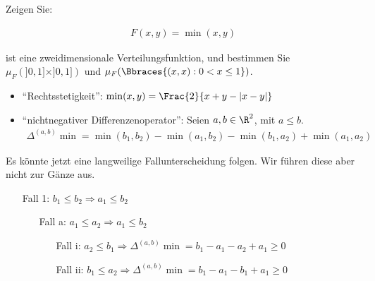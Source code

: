 
\begin{exercise}

Zeigen Sie:

\begin{align*}
  F(x, y) = \min(x, y)
\end{align*}

ist eine zweidimensionale Verteilungsfunktion, und bestimmen Sie $\mu_F(]0, 1] \times ]0, 1])$ und $\mu_F(\Bbraces{(x, x) : 0 < x \leq 1})$.

\end{exercise}


\begin{solution}

\phantom{}

\begin{itemize}

  \item \enquote{Rechtsstetigkeit}: $\min(x, y) = \Frac{2}{x + y - |x - y|}$

  \item \enquote{nichtnegativer Differenzenoperator}: Seien $a, b \in \R^2$, mit $a \leq b$.
  \begin{align*}
    \Delta^{(a, b)} \min
    =
    \min(b_1, b_2) - \min(a_1, b_2) - \min(b_1, a_2) + \min(a_1, a_2)
  \end{align*}

\end{itemize}

Es könnte jetzt eine langweilige Fallunterscheidung folgen. Wir führen diese aber nicht zur Gänze aus.

\begin{itemize}
  \item[Fall 1:] $b_1 \leq b_2 \Rightarrow a_1 \leq b_2$
  \begin{itemize}
    \item[Fall a:] $a_1 \leq a_2 \Rightarrow a_1 \leq b_2$
    \begin{itemize}
      \item[Fall i:] $a_2 \leq b_1 \Rightarrow
      \Delta^{(a, b)} \min = b_1 - a_1 - a_2 + a_1 \geq 0$
      \item[Fall ii:] $b_1 \leq a_2 \Rightarrow
      \Delta^{(a, b)} \min = b_1 - a_1 - b_1 + a_1 \geq 0$
    \end{itemize}
  \end{itemize}
\end{itemize}


\end{solution}
